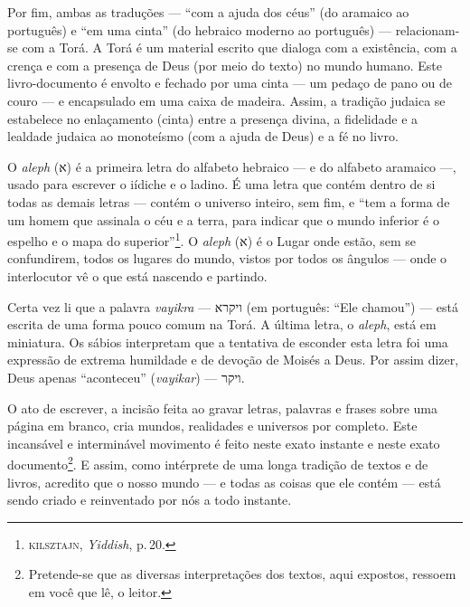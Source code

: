 Por fim, ambas as traduções --- ``com a ajuda dos céus'' (do
aramaico ao português) e ``em uma cinta'' (do hebraico moderno ao
português) --- relacionam-se com a Torá. A Torá é um
material escrito que dialoga com a existência, com a crença e com a
presença de Deus (por meio do texto) no mundo humano. Este
livro-documento é envolto e fechado por uma cinta --- um pedaço de pano
ou de couro --- e encapsulado em uma caixa de madeira. Assim, a tradição
judaica se estabelece no enlaçamento (cinta) entre a presença divina, a
fidelidade e a lealdade judaica ao monoteísmo (com a ajuda de Deus) e a
fé no livro.

\begin{center}\end{center}

\noindent{}O \emph{aleph} ({א}) é a primeira letra do alfabeto hebraico --- e do
alfabeto aramaico ---, usado para escrever o iídiche e o ladino.
É uma letra que contém dentro de si todas as demais letras --- contém o
universo inteiro, sem fim, e ``tem a forma de um homem que
assinala o céu e a terra, para indicar que o mundo inferior é o espelho
e o mapa do superior''\footnote{\textsc{kilsztajn}, \emph{Yiddish}, p.\,20.}. O
\emph{aleph} ({א}) é o Lugar onde estão, sem se confundirem, todos os
lugares do mundo, vistos por todos os ângulos --- onde o interlocutor vê
o que está nascendo e partindo.

Certa vez li que a palavra \emph{vayikra} --- {ויקרא} (em português:
``Ele chamou'') --- está escrita de uma forma pouco comum na
Torá. A última letra, o \emph{aleph}, está em miniatura. Os
sábios interpretam que a tentativa de esconder esta letra foi uma
expressão de extrema humildade e de devoção de Moisés a Deus. Por assim
dizer, Deus apenas ``aconteceu'' (\emph{vayikar}) --- {ויקר}.

\begin{center}\end{center}

\noindent{}O ato de escrever, a incisão feita ao gravar letras, palavras e frases
sobre uma página em branco, cria mundos, realidades e universos por
completo. Este incansável e interminável movimento é feito neste exato
instante e neste exato documento\footnote{Pretende-se que as diversas
  interpretações dos textos, aqui expostos, ressoem em você que lê, o
  leitor.}. E assim, como intérprete de uma longa tradição de textos e
de livros, acredito que o nosso mundo --- e todas as coisas que ele
contém --- está sendo criado e reinventado por nós a todo instante.

